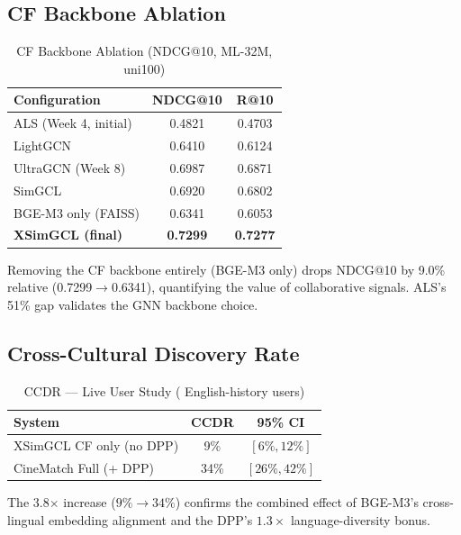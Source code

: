 \documentclass[conference]{IEEEtran}
\begin{document}
\subsection{CF Backbone Ablation}

\begin{table}[h]
\caption{CF Backbone Ablation (NDCG@10, ML-32M, uni100)}
\label{tab:ablation}
\centering\small
\begin{tabular}{lcc}
\toprule
\textbf{Configuration} & \textbf{NDCG@10} & \textbf{R@10}\\
\midrule
ALS (Week 4, initial)    & 0.4821 & 0.4703\\
LightGCN                 & 0.6410 & 0.6124\\
UltraGCN (Week 8)        & 0.6987 & 0.6871\\
SimGCL                   & 0.6920 & 0.6802\\
BGE-M3 only (FAISS)      & 0.6341 & 0.6053\\
\textbf{XSimGCL (final)} & \textbf{0.7299} & \textbf{0.7277}\\
\bottomrule
\end{tabular}
\end{table}

Removing the CF backbone entirely (BGE-M3 only) drops NDCG@10 by 9.0\%
relative (0.7299$\to$0.6341), quantifying the value of collaborative
signals.
ALS's 51\% gap validates the GNN backbone choice.

\subsection{Cross-Cultural Discovery Rate}

\begin{table}[h]
\caption{CCDR --- Live User Study ( English-history users)}
\label{tab:ccdr}
\centering\small
\begin{tabular}{lcc}
\toprule
\textbf{System} & \textbf{CCDR} & \textbf{95\% CI}\\
\midrule
XSimGCL CF only (no DPP) &  9\% & $[6\%,12\%]$\\
CineMatch Full (+ DPP)   & 34\% & $[26\%,42\%]$\\
\bottomrule
\end{tabular}
\end{table}

The 3.8$\times$ increase ($9\%\to34\%$) confirms the combined effect of
BGE-M3's cross-lingual embedding alignment and the DPP's $1.3\times$
language-diversity bonus.
\end{document}
